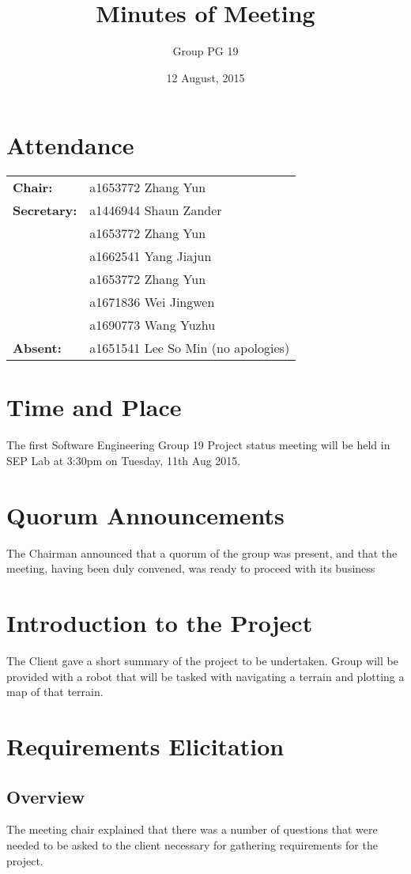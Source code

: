 \documentclass[a4paper]{article}
\title{Minutes of Meeting}
\author{Group PG 19}
\date{12 August, 2015}
\begin{document}
\maketitle
\section*{Attendance}
\begin{tabular}{l l}
\textbf{Chair:} &a1653772 Zhang Yun\\
\textbf{Secretary:}&a1446944 Shaun Zander\\
&a1653772 Zhang Yun\\
&a1662541 Yang Jiajun\\
&a1653772 Zhang Yun\\
&a1671836 Wei Jingwen\\
&a1690773 Wang Yuzhu\\
\textbf{Absent:}&a1651541 Lee So Min (no apologies)
\end{tabular}

\section{Time and Place}
The first Software Engineering Group 19 Project status meeting will be held in SEP Lab at 3:30pm on Tuesday, 11th Aug 2015.

\section{Quorum Announcements}
The Chairman announced that a quorum of the group was present, and that the meeting, having been duly convened, was ready to proceed with its business

\section{Introduction to the Project}
The Client gave a short summary of the project to be undertaken. Group will be provided with a robot that will be tasked with navigating a terrain and plotting a map of that terrain.

\section{Requirements Elicitation}

\subsection{Overview}
The meeting chair explained that there was a number of questions that were needed to be asked to the client necessary for gathering requirements for the project.
\end{document}
